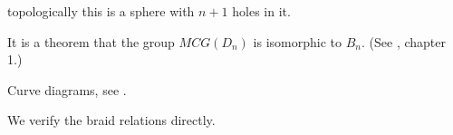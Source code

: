 \documentclass[12pt]{article}
\begin{document}
topologically this is a sphere with $n+1$ holes in it.

It is a theorem that the group $MCG(D_n)$ is isomorphic to $B_n.$
(See \cite{Kassel10}, chapter 1.)

Curve diagrams, see \cite{Dehornoy02}.

We verify the braid relations directly.

%




{}

\end{document}
